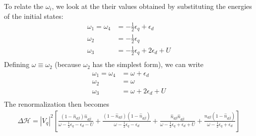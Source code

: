 \documentclass[twoside,11pt]{report}
\numberwithin{equation}{section}
\begin{document}
To relate the \(\omega_i\), we look at the their values obtained by substituting the energies of the initial states:
\begin{equation}\begin{aligned}
	\omega_1 = \omega_4 &= -\frac{1}{2}\epsilon_q + \epsilon_d\\
	\omega_2 &= -\frac{1}{2}\epsilon_q\\
	\omega_3 &= -\frac{1}{2}\epsilon_q + 2\epsilon_d + U\\
\end{aligned}\end{equation}
Defining \(\omega \equiv \omega_2\) (because \(\omega_2\) has the simplest form), we can write
\begin{equation}\begin{aligned}
	\omega_1 = \omega_4 &= \omega + \epsilon_d\\
	\omega_2 &= \omega\\
	\omega_3 &= \omega + 2\epsilon_d + U\\
\end{aligned}\end{equation}
The renormalization then becomes
\begin{equation}\begin{aligned}
	\label{vanilla:siam:ren}
	\Delta \mathcal{H} = |V_q|^2 \left[\frac{\left(1 - \hat n_{d\beta}\right)\hat n_{d\overline\beta}}{\omega - \frac{1}{2}\epsilon_q - \epsilon_d - U} + \frac{\left(1 - \hat n_{d\beta}\right)\left( 1-\hat n_{d\overline\beta} \right)}{\omega - \frac{1}{2}\epsilon_q - \epsilon_d} + \frac{\hat n_{d\beta} \hat n_{d\overline\beta}}{\omega - \frac{1}{2}\epsilon_q + \epsilon_d + U} + \frac{\hat n_{d\beta}\left( 1- \hat n_{d\overline\beta}\right) }{\omega - \frac{1}{2}\epsilon_q + \epsilon_d}\right]
\end{aligned}\end{equation}
\end{document}
